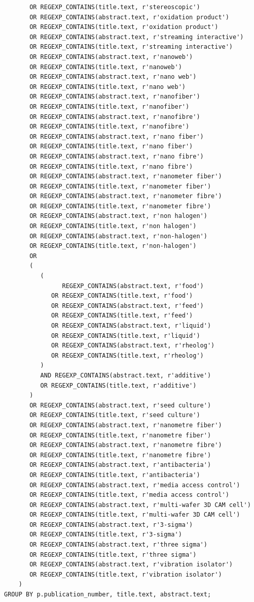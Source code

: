 \begin{verbatim}
       OR REGEXP_CONTAINS(title.text, r'stereoscopic')
       OR REGEXP_CONTAINS(abstract.text, r'oxidation product')  
       OR REGEXP_CONTAINS(title.text, r'oxidation product')
       OR REGEXP_CONTAINS(abstract.text, r'streaming interactive')  
       OR REGEXP_CONTAINS(title.text, r'streaming interactive')
       OR REGEXP_CONTAINS(abstract.text, r'nanoweb')  
       OR REGEXP_CONTAINS(title.text, r'nanoweb')
       OR REGEXP_CONTAINS(abstract.text, r'nano web')  
       OR REGEXP_CONTAINS(title.text, r'nano web')
       OR REGEXP_CONTAINS(abstract.text, r'nanofiber')  
       OR REGEXP_CONTAINS(title.text, r'nanofiber')
       OR REGEXP_CONTAINS(abstract.text, r'nanofibre')  
       OR REGEXP_CONTAINS(title.text, r'nanofibre')
       OR REGEXP_CONTAINS(abstract.text, r'nano fiber')  
       OR REGEXP_CONTAINS(title.text, r'nano fiber')
       OR REGEXP_CONTAINS(abstract.text, r'nano fibre')  
       OR REGEXP_CONTAINS(title.text, r'nano fibre')
       OR REGEXP_CONTAINS(abstract.text, r'nanometer fiber')  
       OR REGEXP_CONTAINS(title.text, r'nanometer fiber')
       OR REGEXP_CONTAINS(abstract.text, r'nanometer fibre')  
       OR REGEXP_CONTAINS(title.text, r'nanometer fibre')
       OR REGEXP_CONTAINS(abstract.text, r'non halogen')  
       OR REGEXP_CONTAINS(title.text, r'non halogen')
       OR REGEXP_CONTAINS(abstract.text, r'non-halogen')  
       OR REGEXP_CONTAINS(title.text, r'non-halogen')
       OR 
       (
          (
                REGEXP_CONTAINS(abstract.text, r'food')  
             OR REGEXP_CONTAINS(title.text, r'food')             
             OR REGEXP_CONTAINS(abstract.text, r'feed')  
             OR REGEXP_CONTAINS(title.text, r'feed')
             OR REGEXP_CONTAINS(abstract.text, r'liquid')  
             OR REGEXP_CONTAINS(title.text, r'liquid') 
             OR REGEXP_CONTAINS(abstract.text, r'rheolog')  
             OR REGEXP_CONTAINS(title.text, r'rheolog') 
          )
          AND REGEXP_CONTAINS(abstract.text, r'additive')  
          OR REGEXP_CONTAINS(title.text, r'additive')
       )
       OR REGEXP_CONTAINS(abstract.text, r'seed culture')  
       OR REGEXP_CONTAINS(title.text, r'seed culture')
       OR REGEXP_CONTAINS(abstract.text, r'nanometre fiber')  
       OR REGEXP_CONTAINS(title.text, r'nanometre fiber')
       OR REGEXP_CONTAINS(abstract.text, r'nanometre fibre')  
       OR REGEXP_CONTAINS(title.text, r'nanometre fibre')
       OR REGEXP_CONTAINS(abstract.text, r'antibacteria')  
       OR REGEXP_CONTAINS(title.text, r'antibacteria')
       OR REGEXP_CONTAINS(abstract.text, r'media access control')  
       OR REGEXP_CONTAINS(title.text, r'media access control')
       OR REGEXP_CONTAINS(abstract.text, r'multi-wafer 3D CAM cell')  
       OR REGEXP_CONTAINS(title.text, r'multi-wafer 3D CAM cell')
       OR REGEXP_CONTAINS(abstract.text, r'3-sigma')  
       OR REGEXP_CONTAINS(title.text, r'3-sigma')
       OR REGEXP_CONTAINS(abstract.text, r'three sigma')  
       OR REGEXP_CONTAINS(title.text, r'three sigma')                   
       OR REGEXP_CONTAINS(abstract.text, r'vibration isolator')  
       OR REGEXP_CONTAINS(title.text, r'vibration isolator')                   
    )
GROUP BY p.publication_number, title.text, abstract.text;
\end{verbatim}

